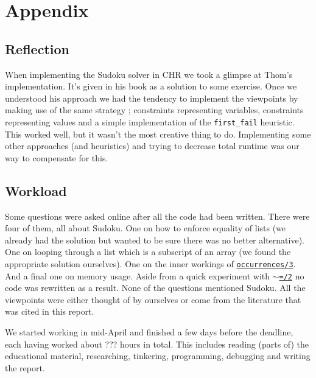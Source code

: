 \section*{Appendix}
\label{sec:appendix}

\subsection*{Reflection}\label{sec:reflection}

When implementing the Sudoku solver in CHR we took a glimpse at Thom's implementation. It's given in his book as a solution to some exercise. Once we understood his approach we had the tendency to implement the viewpoints by making use of the same strategy ; constraints representing variables, constraints representing values and a simple implementation of the \texttt{first\_fail} heuristic. This worked well, but it wasn't the most creative thing to do. Implementing some other approaches (and heuristics) and trying to decrease total runtime was our way to compensate for this.

\subsection*{Workload}\label{sec:workload}

Some questions were asked online after all the code had been written. There were four of them, all about Sudoku. One on how to enforce equality of lists (we already had the solution but wanted to be sure there was no better alternative). One on looping through a list which is a subscript of an array (we found the appropriate solution ourselves). One on the inner workings of \href{http://eclipseclp.org/doc/bips/lib/ic_global/occurrences-3.html}{\texttt{occurrences/3}}. And a final one on memory usage. Aside from a quick experiment with \href{https://eclipseclp.org/doc/bips/kernel/termcomp/TE-2.html}{\texttt{$\sim$=/2}} no code was rewritten as a result. None of the questions mentioned Sudoku. All the viewpoints were either thought of by ourselves or come from the literature that was cited in this report.\\\par

We started working in mid-April and finished a few days before the deadline, each having worked about ??? hours in total. This includes reading (parts of) the educational material, researching, tinkering, programming, debugging and writing the report.

